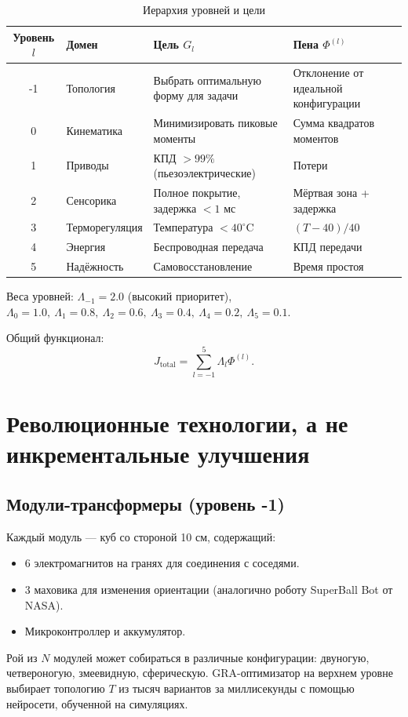 \documentclass[12pt,a4paper]{article}
\begin{document}
\begin{table}[h]
\centering
\caption{Иерархия уровней и цели}
\label{tab:hierarchy}
\begin{tabular}{cllp{7cm}}
\toprule
Уровень \(l\) & Домен & Цель \(G_l\) & Пена \(\Phi^{(l)}\) \\
\midrule
-1 & Топология & Выбрать оптимальную форму для задачи & Отклонение от идеальной конфигурации \\
0 & Кинематика & Минимизировать пиковые моменты & Сумма квадратов моментов \\
1 & Приводы & КПД \(> 99\%\) (пьезоэлектрические) & Потери \\
2 & Сенсорика & Полное покрытие, задержка \(< 1\) мс & Мёртвая зона + задержка \\
3 & Терморегуляция & Температура \(< 40^\circ\)C & \((T-40)/40\) \\
4 & Энергия & Беспроводная передача & КПД передачи \\
5 & Надёжность & Самовосстановление & Время простоя \\
\bottomrule
\end{tabular}
\end{table}

Веса уровней: \(\Lambda_{-1}=2.0\) (высокий приоритет), \(\Lambda_0=1.0,\ \Lambda_1=0.8,\ \Lambda_2=0.6,\ \Lambda_3=0.4,\ \Lambda_4=0.2,\ \Lambda_5=0.1\).

Общий функционал:
\[
J_{\text{total}} = \sum_{l=-1}^{5} \Lambda_l \Phi^{(l)}.
\]

\section{Революционные технологии, а не инкрементальные улучшения}

\subsection{Модули-трансформеры (уровень -1)}

Каждый модуль — куб со стороной 10 см, содержащий:
\begin{itemize}
    \item 6 электромагнитов на гранях для соединения с соседями.
    \item 3 маховика для изменения ориентации (аналогично роботу SuperBall Bot от NASA).
    \item Микроконтроллер и аккумулятор.
\end{itemize}
Рой из \(N\) модулей может собираться в различные конфигурации: двуногую, четвероногую, змеевидную, сферическую. GRA-оптимизатор на верхнем уровне выбирает топологию \(T\) из тысяч вариантов за миллисекунды с помощью нейросети, обученной на симуляциях.
\end{document}
